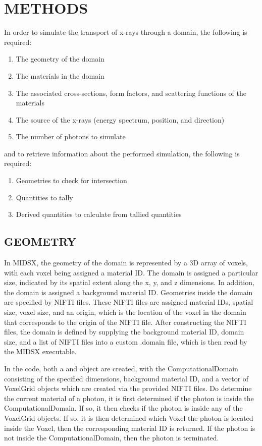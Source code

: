 \section{METHODS}

In order to simulate the transport of x-rays through a domain, the following is required:

\begin{enumerate}
    \item The geometry of the domain
    \item The materials in the domain
    \item The associated cross-sections, form factors, and scattering functions of the materials
    \item The source of the x-rays (energy spectrum, position, and direction)
    \item The number of photons to simulate
\end{enumerate}

and to retrieve information about the performed simulation, the following is required:

\begin{enumerate}
    \item Geometries to check for intersection
    \item Quantities to tally
    \item Derived quantities to calculate from tallied quantities
\end{enumerate}

\subsection{GEOMETRY}
\par In MIDSX, the geometry of the domain is represented by a 3D array of voxels, with each voxel being assigned a material ID. The domain is assigned a particular size, indicated by its spatial extent along the x, y, and z dimensions. In addition, the domain is assigned a background material ID. Geometries inside the domain are specified by NIFTI files. These NIFTI files are assigned material IDs, spatial size, voxel size, and an origin, which is the location of the voxel in the domain that corresponds to the origin of the NIFTI file. After constructing the NIFTI files, the domain is defined by supplying the background material ID, domain size, and a list of NIFTI files into a custom .domain file, which is then read by the MIDSX executable. \\
\par In the code, both a  and  object are created, with the ComputationalDomain consisting of the specified dimensions, background material ID, and a vector of VoxelGrid objects which are created via the provided NIFTI files. Do determine the current material of a photon, it is first determined if the photon is inside the ComputationalDomain. If so, it then checks if the photon is inside any of the VoxelGrid objects. If so, it is then determined which Voxel the photon is located inside the Voxel, then the corresponding material ID is returned. If the photon is not inside the ComputationalDomain, then the photon is terminated. \\

